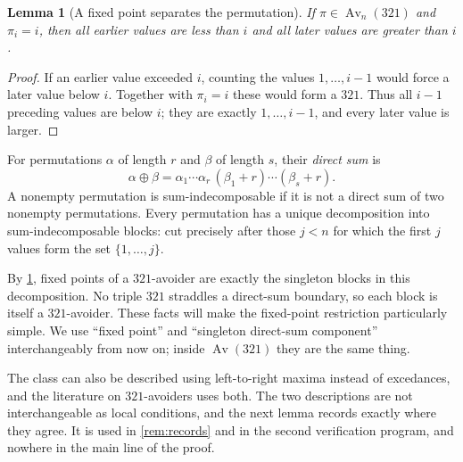 \documentclass[11pt,letterpaper]{article}
\numberwithin{equation}{section}
\newtheorem{lemma}[theorem]{Lemma}
\theoremstyle{definition}
\DeclareMathOperator{\Av}{Av}
\begin{document}
\begin{lemma}[A fixed point separates the permutation]
\label{lem:fixed}
If $\pi\in\Av_n(321)$ and $\pi_i=i$, then all earlier values are less
than $i$ and all later values are greater than $i$.
\end{lemma}
\begin{proof}
If an earlier value exceeded $i$, counting the values $1,\ldots,i-1$
would force a later value below $i$. Together with $\pi_i=i$ these would
form a $321$. Thus all $i-1$ preceding values are below $i$; they are
exactly $1,\ldots,i-1$, and every later value is larger.
\end{proof}

For permutations $\alpha$ of length $r$ and $\beta$ of length $s$, their
\emph{direct sum} is
\[
 \alpha\oplus\beta
   =\alpha_1\cdots\alpha_r\,(\beta_1+r)\cdots(\beta_s+r).
\]
A nonempty permutation is sum-indecomposable if it is not a direct sum
of two nonempty permutations. Every permutation has a unique decomposition
into sum-indecomposable blocks: cut precisely after those $j<n$ for which
the first $j$ values form the set $\{1,\ldots,j\}$.

By \cref{lem:fixed}, fixed points of a $321$-avoider are exactly the
singleton blocks in this decomposition. No triple $321$ straddles a
direct-sum boundary, so each block is itself a $321$-avoider.
These facts will make the fixed-point restriction particularly simple.
We use ``fixed point'' and ``singleton direct-sum component''
interchangeably from now on; inside $\Av(321)$ they are the same thing.

The class can also be described using left-to-right maxima instead of
excedances, and the literature on $321$-avoiders uses both. The two
descriptions are not interchangeable as local conditions, and the next
lemma records exactly where they agree. It is used in
\cref{rem:records} and in the second verification program, and nowhere in
the main line of the proof.
\end{document}
